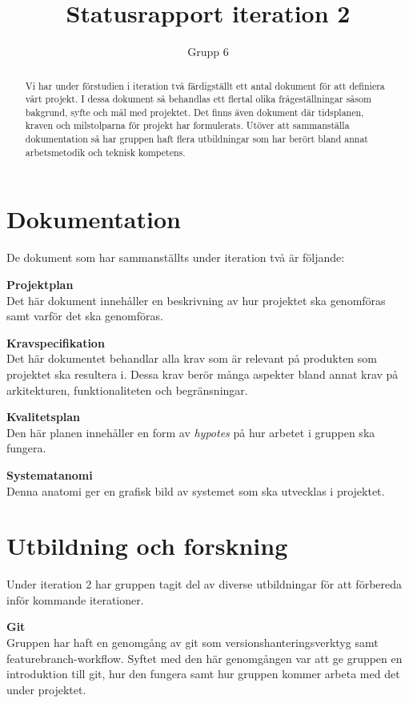 \documentclass[a4paper,10pt]{article}
\title{ Statusrapport iteration 2 }
\author{Grupp 6}
\begin{document}
\begin{titlingpage}
    \maketitle
    \begin{abstract}
    \noindent Vi har under förstudien i iteration två färdigställt ett antal dokument för att definiera vårt projekt. I dessa dokument så behandlas ett flertal olika frågeställningar såsom bakgrund, syfte och mål med projektet. Det finns även dokument där tidsplanen, kraven och milstolparna för projekt har formulerats. Utöver att sammanställa dokumentation så har gruppen haft flera utbildningar som har berört bland annat arbetsmetodik och teknisk kompetens.
    \end{abstract}
\end{titlingpage}

\section{Dokumentation}
\label{sec:Dokumentation}
De dokument som har sammanställts under iteration två är följande:

\textbf{Projektplan}\\ Det här dokument innehåller en beskrivning av hur projektet ska genomföras samt varför det ska genomföras.

\textbf{Kravspecifikation}\\ Det här dokumentet behandlar alla krav som är relevant på produkten som projektet ska resultera i. Dessa krav berör många aspekter bland annat krav på arkitekturen, funktionaliteten och begränsningar.

\textbf{Kvalitetsplan}\\ Den här planen innehåller en form av \emph{hypotes} på hur arbetet i gruppen ska fungera.

\textbf{Systematanomi}\\ Denna anatomi ger en grafisk bild av systemet som ska utvecklas i projektet.

\section{Utbildning och forskning}
\label{sec:Utbildning och forskning}
Under iteration 2 har gruppen tagit del av diverse utbildningar för att förbereda inför kommande iterationer.

\textbf{Git}\\ Gruppen har haft en genomgång av git som versionshanteringsverktyg samt featurebranch-workflow. Syftet med den här genomgången var att ge gruppen en introduktion till git, hur den fungera samt hur gruppen kommer arbeta med det under projektet.
\end{document}
